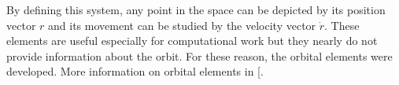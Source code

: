 By defining this system, any point in the space can be depicted by its position vector $r$ and its movement can be studied by the velocity vector $\dot{r}$. These elements are useful especially for computational work but they nearly do not provide information about the orbit. For these reason, the orbital elements were developed. More information on orbital elements in [\cite[Chapter 1, Section 1]{annex1}.
%
